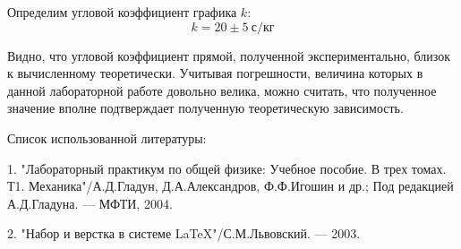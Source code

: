 \documentclass[14pt]{article}
\begin{document}
Определим угловой коэффициент графика $k$:
$$
	k = 20 \pm 5~\text{с/кг}
$$

Видно, что угловой коэффициент прямой, полученной экспериментально, близок к вычисленному теоретически. Учитывая погрешности, величина которых в данной лабораторной работе довольно велика, можно считать, что полученное значение вполне подтверждает полученную теоретическую зависимость.

\newpage
Список использованной литературы:
	
\vspace{0.5cm}
1. "Лабораторный практикум по общей физике: Учебное пособие. В трех томах. Т1. Механика"/А.Д.Гладун, Д.А.Александров,
Ф.Ф.Игошин и др.; Под редакцией А.Д.Гладуна. --- МФТИ, 2004.

2. "Набор и верстка в системе \LaTeX "/С.М.Львовский. --- 2003.
\end{document}
